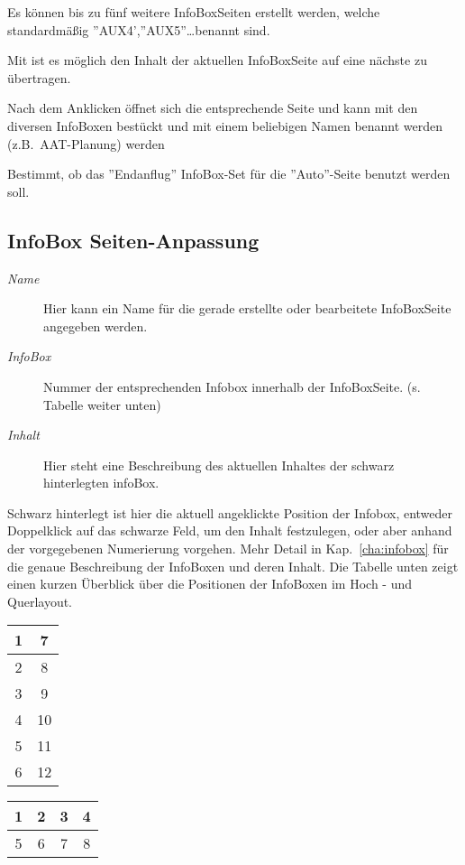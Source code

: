 Es können bis zu fünf weitere InfoBoxSeiten erstellt werden, welche
standardmäßig ''AUX4',''AUX5''\dots benannt sind.

Mit  ist es möglich den Inhalt der aktuellen InfoBoxSeite auf eine nächste zu übertragen.

Nach dem Anklicken öffnet sich die entsprechende Seite und kann mit den diversen InfoBoxen bestückt
und mit einem beliebigen Namen benannt werden (z.B.\ AAT-Planung) werden

  Bestimmt, ob das ''Endanflug'' InfoBox-Set für die
 ''Auto''-Seite benutzt werden soll.
%
\subsection*{InfoBox Seiten-Anpassung}
%
\begin{description}
\item[\textit{Name}]  Hier kann ein Name für die gerade erstellte oder bearbeitete InfoBoxSeite angegeben werden.
\item[\textit{InfoBox}]  Nummer der entsprechenden Infobox innerhalb der InfoBoxSeite. (s. Tabelle weiter unten)
\item[\textit{Inhalt}]  Hier steht eine Beschreibung des aktuellen Inhaltes der schwarz hinterlegten infoBox.
\end{description}



Schwarz hinterlegt ist hier die aktuell angeklickte Position der Infobox, entweder Doppelklick auf das schwarze Feld, um
den Inhalt festzulegen, oder aber anhand der vorgegebenen Numerierung vorgehen. Mehr Detail in Kap.~\ref{cha:infobox} für die genaue Beschreibung der InfoBoxen und deren Inhalt.
Die Tabelle unten zeigt einen kurzen Überblick über die Positionen der InfoBoxen im Hoch - und Querlayout.
\begin{center}\begin{multicols}{2}
\begin{tabular}{|c|c|}
\hline
1 & 7 \\
\hline
2 & 8 \\
\hline
3 & 9 \\
\hline
4 & 10 \\
\hline
5 & 11 \\
\hline
6 & 12 \\
\hline
\end{tabular}

\begin{tabular}{|c|c|c|c|}
\hline
1 & 2 & 3 & 4 \\
\hline
\hline
5 & 6 & 7 & 8 \\
\hline
\end{tabular}
\end{multicols}
\end{center}


